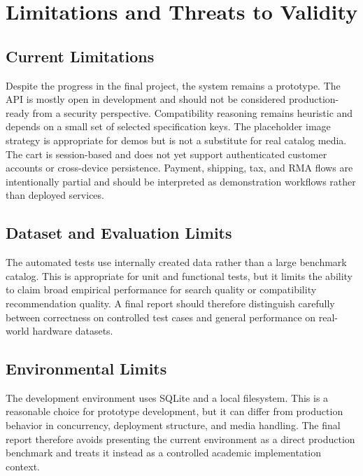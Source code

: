 \documentclass[12pt,letterpaper,oneside,openany]{book}
\begin{document}
\chapter{Limitations and Threats to Validity}

\section{Current Limitations}

\begin{justifying}
Despite the progress in the final project, the system remains a prototype. The
API is mostly open in development and should not be considered
production-ready from a security perspective. Compatibility reasoning remains
heuristic and depends on a small set of selected specification keys. The
placeholder image strategy is appropriate for demos but is not a substitute for
real catalog media. The cart is session-based and does not yet support
authenticated customer accounts or cross-device persistence. Payment, shipping,
tax, and RMA flows are intentionally partial and should be interpreted as
demonstration workflows rather than deployed services.
\end{justifying}

\section{Dataset and Evaluation Limits}

\begin{justifying}
The automated tests use internally created data rather than a large benchmark
catalog. This is appropriate for unit and functional tests, but it limits the
ability to claim broad empirical performance for search quality or compatibility
recommendation quality. A final report should therefore distinguish carefully
between correctness on controlled test cases and general performance on
real-world hardware datasets.
\end{justifying}

\section{Environmental Limits}

\begin{justifying}
The development environment uses SQLite and a local filesystem. This is a
reasonable choice for prototype development, but it can differ from production
behavior in concurrency, deployment structure, and media handling. The final
report therefore avoids presenting the current environment as a direct
production benchmark and treats it instead as a controlled academic
implementation context.
\end{justifying}
\end{document}
